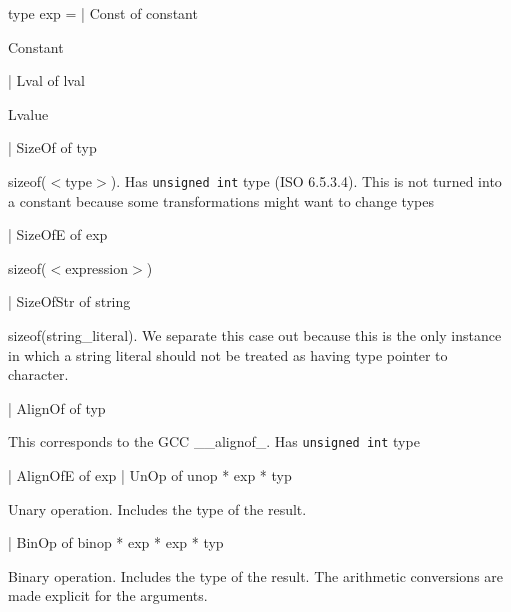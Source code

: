 \documentclass[11pt]{article}
\begin{document}
\label{type:Cil.exp}\begin{ocamldoccode}
type exp =
  | Const of constant
\end{ocamldoccode}
\begin{ocamldoccomment}
Constant
\end{ocamldoccomment}
\begin{ocamldoccode}
  | Lval of lval
\end{ocamldoccode}
\begin{ocamldoccomment}
Lvalue
\end{ocamldoccomment}
\begin{ocamldoccode}
  | SizeOf of typ
\end{ocamldoccode}
\begin{ocamldoccomment}
sizeof($<$type$>$). Has {\tt{unsigned int}} type (ISO 6.5.3.4). This is not 
 turned into a constant because some transformations might want to 
 change types
\end{ocamldoccomment}
\begin{ocamldoccode}
  | SizeOfE of exp
\end{ocamldoccode}
\begin{ocamldoccomment}
sizeof($<$expression$>$)
\end{ocamldoccomment}
\begin{ocamldoccode}
  | SizeOfStr of string
\end{ocamldoccode}
\begin{ocamldoccomment}
sizeof(string\_literal). We separate this case out because this is the 
 only instance in which a string literal should not be treated as 
 having type pointer to character.
\end{ocamldoccomment}
\begin{ocamldoccode}
  | AlignOf of typ
\end{ocamldoccode}
\begin{ocamldoccomment}
This corresponds to the GCC \_\_alignof\_. Has {\tt{unsigned int}} type
\end{ocamldoccomment}
\begin{ocamldoccode}
  | AlignOfE of exp
  | UnOp of unop * exp * typ
\end{ocamldoccode}
\begin{ocamldoccomment}
Unary operation. Includes the type of the result.
\end{ocamldoccomment}
\begin{ocamldoccode}
  | BinOp of binop * exp * exp * typ
\end{ocamldoccode}
\begin{ocamldoccomment}
Binary operation. Includes the type of the result. The arithmetic 
 conversions are made explicit for the arguments.
\end{ocamldoccomment}
\end{document}

